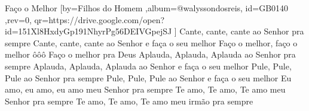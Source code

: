 \beginsong
{Faço o Melhor %
}[by={Filhos do Homem %
},album={@walyssondosreis},
id={GB0140 %
},rev={0}, %
qr={https://drive.google.com/open?id=151Xl8HxdyGp191NhyrPg56DEIVGpejSJ %
}]
\beginverse*
Cante, cante, cante ao Senhor pra sempre
Cante, cante, cante ao Senhor e faça o seu melhor
\endverse
\beginchorus
Faço o melhor, faço o melhor ôôô
Faço o melhor pra Deus
\endchorus
\beginverse*
Aplauda, Aplauda, Aplauda ao Senhor pra sempre
Aplauda, Aplauda, Aplauda ao Senhor e faça o seu melhor
\endverse
\beginverse*
Pule, Pule, Pule ao Senhor pra sempre
Pule, Pule, Pule ao Senhor e faça o seu melhor
\endverse
\beginverse*
Eu amo, eu amo, eu amo meu Senhor pra sempre
Te amo, Te amo, Te amo meu Senhor pra sempre
Te amo, Te amo, Te amo meu irmão pra sempre
\endverse

